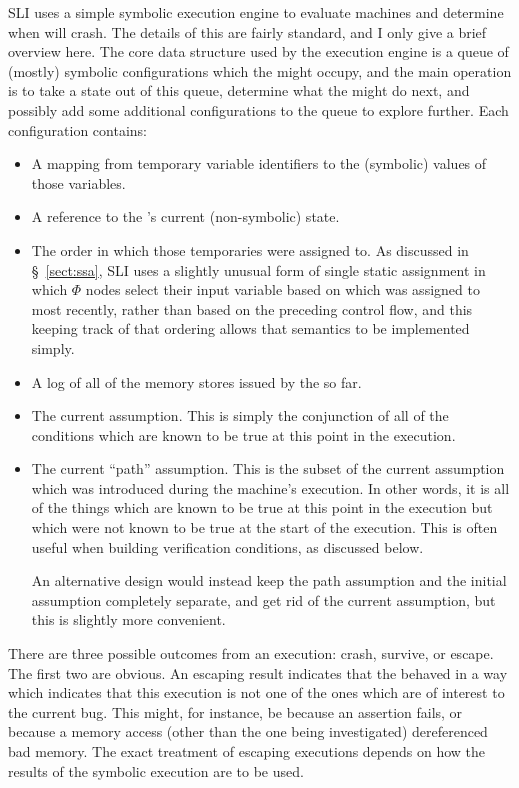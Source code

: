 SLI uses a simple symbolic execution engine to evaluate machines and
determine when \StateMachines will crash.  The details of this are
fairly standard, and I only give a brief overview
here.  The core data structure
used by the execution engine is a queue of (mostly) symbolic
configurations which the \StateMachine might occupy, and the main
operation is to take a state out of this queue, determine what the
\StateMachine might do next, and possibly add some additional
configurations to the queue to explore further.  Each configuration
contains:

\begin{itemize}
\item
  A mapping from temporary variable identifiers to the (symbolic) values of those variables.
\item
  A reference to the {\StateMachine}'s current (non-symbolic) state.
\item
  The order in which those temporaries were assigned to.
  As discussed in \S~\ref{sect:ssa}, SLI uses a slightly unusual form of single static assignment in which $\Phi$ nodes select their input variable based on which was assigned to most recently, rather than based on the preceding control flow, and this keeping track of that ordering allows that semantics to be implemented simply.
\item
  A log of all of the memory stores issued by the \StateMachine so far.
\item
  The current assumption.
  This is simply the conjunction of all of the conditions which are known to be true at this point in the execution.
\item
  The current ``path'' assumption.
  This is the subset of the current assumption which was introduced during the machine's execution.
  In other words, it is all of the things which are known to be true at this point in the execution but which were not known to be true at the start of the execution.
  This is often useful when building verification conditions, as discussed below.

  An alternative design would instead keep the path assumption and the initial assumption completely separate, and get rid of the current assumption, but this is slightly more convenient.
\end{itemize}

There are three possible outcomes from an execution: crash, survive, or escape.
The first two are obvious.
An escaping result indicates that the \StateMachine behaved in a way which indicates that this execution is not one of the ones which are of interest to the current bug.
This might, for instance, be because an assertion fails, or because a memory access (other than the one being investigated) dereferenced bad memory.
The exact treatment of escaping executions depends on how the results of the symbolic execution are to be used.

